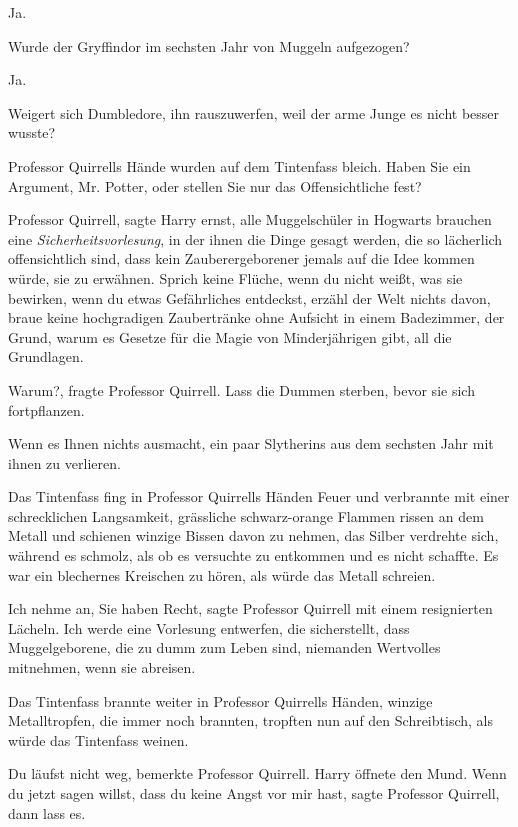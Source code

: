 \glqq Ja.\grqq{}

\glqq Wurde der Gryffindor im sechsten Jahr von Muggeln aufgezogen?\grqq{}

\glqq Ja.\grqq{}

\glqq Weigert sich Dumbledore, ihn rauszuwerfen, weil der arme Junge es nicht
besser wusste?\grqq{}

Professor Quirrells Hände wurden auf dem Tintenfass bleich. \glqq Haben Sie ein
Argument, Mr. Potter, oder stellen Sie nur das Offensichtliche fest?\grqq{}

\glqq Professor Quirrell\grqq{}, sagte Harry ernst, \glqq alle Muggelschüler in
Hogwarts brauchen eine \emph{Sicherheitsvorlesung}, in der ihnen die Dinge
gesagt werden, die so lächerlich offensichtlich sind, dass kein
Zauberergeborener jemals auf die Idee kommen würde, sie zu erwähnen. Sprich
keine Flüche, wenn du nicht weißt, was sie bewirken, wenn du etwas Gefährliches
entdeckst, erzähl der Welt nichts davon, braue keine hochgradigen Zaubertränke
ohne Aufsicht in einem Badezimmer, der Grund, warum es Gesetze für die Magie von
Minderjährigen gibt, all die Grundlagen.\grqq{}

\glqq Warum?\grqq{}, fragte Professor Quirrell. \glqq Lass die Dummen sterben,
bevor sie sich fortpflanzen.\grqq{}

\glqq Wenn es Ihnen nichts ausmacht, ein paar Slytherins aus dem sechsten Jahr
mit ihnen zu verlieren.\grqq{}

Das Tintenfass fing in Professor Quirrells Händen Feuer und verbrannte mit einer
schrecklichen Langsamkeit, grässliche schwarz-orange Flammen rissen an dem
Metall und schienen winzige Bissen davon zu nehmen, das Silber verdrehte sich,
während es schmolz, als ob es versuchte zu entkommen und es nicht schaffte. Es
war ein blechernes Kreischen zu hören, als würde das Metall schreien.

\glqq Ich nehme an, Sie haben Recht\grqq{}, sagte Professor Quirrell mit einem
resignierten Lächeln. \glqq Ich werde eine Vorlesung entwerfen, die
sicherstellt, dass Muggelgeborene, die zu dumm zum Leben sind, niemanden
Wertvolles mitnehmen, wenn sie abreisen.\grqq{}

Das Tintenfass brannte weiter in Professor Quirrells Händen, winzige
Metalltropfen, die immer noch brannten, tropften nun auf den Schreibtisch, als
würde das Tintenfass weinen.

\glqq Du läufst nicht weg\grqq{}, bemerkte Professor Quirrell. Harry öffnete den
Mund. \glqq Wenn du jetzt sagen willst, dass du keine Angst vor mir hast\grqq{},
sagte Professor Quirrell, \glqq dann lass es.\grqq{}

